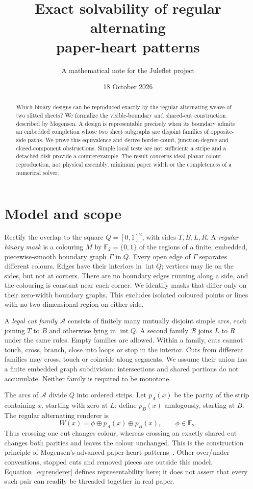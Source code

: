 \documentclass[11pt,a4paper]{article}
\title{Exact solvability of regular alternating\\paper-heart patterns}
\author{A mathematical note for the Juleflet project}
\date{18 October 2026}
\theoremstyle{definition}
\newcommand{\F}{\mathbb{F}_2}
\newcommand{\intr}{\operatorname{int}}
\newcommand{\xor}{\oplus}
\begin{document}
\maketitle
\begin{abstract}
Which binary designs can be reproduced exactly by the regular alternating
weave of two slitted sheets? We formalize the visible-boundary and shared-cut
construction described by Mogensen. A design is representable precisely when
its boundary admits an embedded completion whose two sheet subgraphs are
disjoint families of opposite-side paths. We prove this equivalence and derive
border-count, junction-degree and closed-component obstructions. Simple local
tests are not sufficient: a stripe and a detached disk provide a counterexample.
The result concerns ideal planar colour reproduction, not physical assembly,
minimum paper width or the completeness of a numerical solver.
\end{abstract}

\section{Model and scope}
Rectify the overlap to the square $Q=[0,1]^2$, with sides $T,B,L,R$.
A \emph{regular binary mask} is a colouring $M$ by $\F=\{0,1\}$ of the
regions of a finite, embedded, piecewise-smooth boundary graph $\Gamma$ in $Q$.
Every open edge of $\Gamma$ separates different colours. Edges have their
interiors in $\intr Q$; vertices may lie on the sides, but not at corners.
There are no boundary edges running along a side, and the colouring is constant
near each corner. We identify masks that differ only on their zero-width
boundary graphs. This excludes isolated coloured points or lines with no
two-dimensional region on either side.

A \emph{legal cut family} $\mathcal A$ consists of finitely many mutually
disjoint simple arcs, each joining $T$ to $B$ and otherwise lying in $\intr Q$.
A second family $\mathcal B$ joins $L$ to $R$ under the same rules. Empty
families are allowed. Within a family, cuts cannot touch, cross, branch, close
into loops or stop in the interior. Cuts from different families may cross,
touch or coincide along segments. We assume their union has a finite embedded
graph subdivision: intersections and shared portions do not accumulate.
Neither family is required to be monotone.

The arcs of $\mathcal A$ divide $Q$ into ordered strips. Let $p_A(x)$ be
the parity of the strip containing $x$, starting with zero at $L$; define
$p_B(x)$ analogously, starting at $B$. The regular alternating renderer is
\begin{equation}\label{eq:renderer}
  W(x)=\phi\xor p_A(x)\xor p_B(x),\qquad \phi\in\F.
\end{equation}
Thus crossing one cut changes colour, whereas crossing an exactly shared cut
changes both parities and leaves the colour unchanged. This is the construction
principle of Mogensen's advanced paper-heart patterns~\cite[\S4]{mogensen}.
Other over/under conventions, stopped cuts and removed pieces are outside this
model. Equation~\eqref{eq:renderer} defines representability here; it does not
assert that every such pair can readily be threaded together in real paper.
\end{document}
